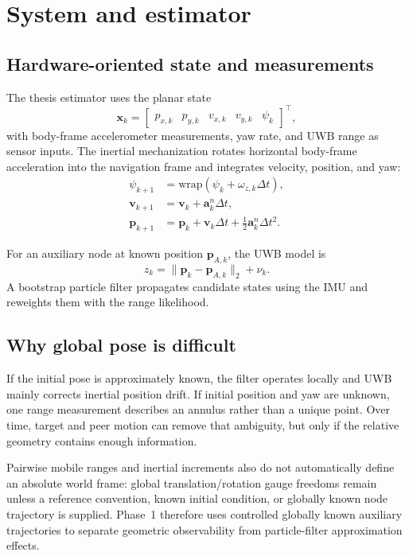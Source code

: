 \section{System and estimator}

\subsection{Hardware-oriented state and measurements}
The thesis estimator uses the planar state
\begin{equation}
    \bm{x}_k=
    \begin{bmatrix}
        p_{x,k} & p_{y,k} & v_{x,k} & v_{y,k} & \psi_k
    \end{bmatrix}^{\top},
\end{equation}
with body-frame accelerometer measurements, yaw rate, and UWB range as sensor inputs. The inertial mechanization rotates horizontal body-frame acceleration into the navigation frame and integrates velocity, position, and yaw:
\begin{align}
    \psi_{k+1} &= \mathrm{wrap}\!\left(\psi_k+\omega_{z,k}\Delta t\right),\\
    \bm{v}_{k+1} &= \bm{v}_k+\bm{a}^{n}_k\Delta t,\\
    \bm{p}_{k+1} &= \bm{p}_k+\bm{v}_k\Delta t+\tfrac12\bm{a}^{n}_k\Delta t^2.
\end{align}

For an auxiliary node at known position $\bm{p}_{A,k}$, the UWB model is
\begin{equation}
    z_k=\lVert\bm{p}_k-\bm{p}_{A,k}\rVert_2+\nu_k.
\end{equation}
A bootstrap particle filter propagates candidate states using the IMU and reweights them with the range likelihood.

\subsection{Why global pose is difficult}
If the initial pose is approximately known, the filter operates locally and UWB mainly corrects inertial position drift. If initial position and yaw are unknown, one range measurement describes an annulus rather than a unique point. Over time, target and peer motion can remove that ambiguity, but only if the relative geometry contains enough information.

Pairwise mobile ranges and inertial increments also do not automatically define an absolute world frame: global translation/rotation gauge freedoms remain unless a reference convention, known initial condition, or globally known node trajectory is supplied. Phase~1 therefore uses controlled globally known auxiliary trajectories to separate geometric observability from particle-filter approximation effects.

